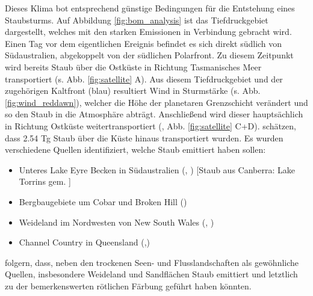 \documentclass[12pt,a4paper,onecolumn]{scrartcl}
\begin{document}
Dieses Klima bot entsprechend günstige Bedingungen für die Entstehung eines Staubsturms. Auf Abbildung \ref{fig:bom_analysis} ist das Tiefdruckgebiet dargestellt, welches mit den starken Emissionen in Verbindung gebracht wird. Einen Tag vor dem eigentlichen Ereignis befindet es sich direkt südlich von Südaustralien, abgekoppelt von der südlichen Polarfront. Zu diesem Zeitpunkt wird bereits Staub über die Ostküste in Richtung Tasmanisches Meer transportiert (s. Abb. \ref{fig:satellite} A). Aus diesem Tiefdruckgebiet und der zugehörigen Kaltfront (blau) resultiert Wind in Sturmstärke (s. Abb. \ref{fig:wind_reddawn}), welcher die Höhe der planetaren Grenzschicht verändert \citep{AlizadehChoobari.2012} und so den Staub in die Atmosphäre abträgt. Anschließend wird dieser hauptsächlich in Richtung Ostküste weitertransportiert (\cite{Leys.2011}, Abb. \ref{fig:satellite} C+D). \citet{Leys.2011} schätzen, dass 2.54 Tg Staub über die Küste hinaus transportiert wurden. Es wurden verschiedene Quellen identifiziert, welche Staub emittiert haben sollen:
\begin{itemize}
\item Unteres Lake Eyre Becken in Südaustralien (\cite{Leys.2011}, \cite{Leys.2009}) [Staub aus Canberra: Lake Torrins gem. \cite{Deckker.2014}]
\item Bergbaugebiete um Cobar und Broken Hill  (\cite{Leys.2011})
\item Weideland im Nordwesten von New South Wales (\cite{Leys.2011}, \cite{Leys.2009})
\item Channel Country in Queensland (\cite{Leys.2011},\cite{Leys.2009})
\end{itemize}
\citet{Leys.2011} folgern, dass, neben den trockenen Seen- und Flusslandschaften als gewöhnliche Quellen, insbesondere Weideland und Sandflächen Staub emittiert und letztlich zu der bemerkenswerten rötlichen Färbung geführt haben könnten.
\end{document}

